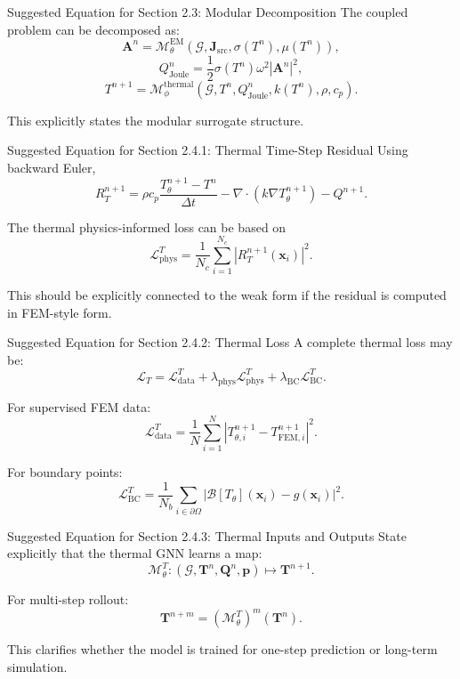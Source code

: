 \documentclass[aspectratio=169]{beamer}
\begin{document}
\begin{frame}{Suggested Equation for Section 2.3: Modular Decomposition}
The coupled problem can be decomposed as:
\[
\mathbf{A}^{n}
=
\mathcal{M}_{\theta}^{\mathrm{EM}}
\left(
\mathcal{G},\mathbf{J}_{\mathrm{src}},\sigma(T^n),\mu(T^n)
\right),
\]
\[
Q_{\mathrm{Joule}}^{n}
=
\frac{1}{2}\sigma(T^n)\omega^2|\mathbf{A}^{n}|^2,
\]
\[
T^{n+1}
=
\mathcal{M}_{\phi}^{\mathrm{thermal}}
\left(
\mathcal{G},T^n,Q_{\mathrm{Joule}}^n,k(T^n),\rho,c_p
\right).
\]

This explicitly states the modular surrogate structure.
\end{frame}

\begin{frame}{Suggested Equation for Section 2.4.1: Thermal Time-Step Residual}
Using backward Euler,
\[
R_T^{n+1}
=
\rho c_p
\frac{T_\theta^{n+1}-T^n}{\Delta t}
-
\nabla\cdot(k\nabla T_\theta^{n+1})
-
Q^{n+1}.
\]

The thermal physics-informed loss can be based on
\[
\mathcal{L}_{\mathrm{phys}}^T
=
\frac{1}{N_c}\sum_{i=1}^{N_c}
\left|R_T^{n+1}(\mathbf{x}_i)\right|^2.
\]

This should be explicitly connected to the weak form if the residual is computed in FEM-style form.
\end{frame}

\begin{frame}{Suggested Equation for Section 2.4.2: Thermal Loss}
A complete thermal loss may be:
\[
\mathcal{L}_{T}
=
\mathcal{L}_{\mathrm{data}}^T
+
\lambda_{\mathrm{phys}}\mathcal{L}_{\mathrm{phys}}^T
+
\lambda_{\mathrm{BC}}\mathcal{L}_{\mathrm{BC}}^T.
\]

For supervised FEM data:
\[
\mathcal{L}_{\mathrm{data}}^T
=
\frac{1}{N}\sum_{i=1}^N
\left|
T_{\theta,i}^{n+1}
-
T_{\mathrm{FEM},i}^{n+1}
\right|^2.
\]

For boundary points:
\[
\mathcal{L}_{\mathrm{BC}}^T
=
\frac{1}{N_b}\sum_{i\in\partial\Omega}
\left|
\mathcal{B}[T_\theta](\mathbf{x}_i)-g(\mathbf{x}_i)
\right|^2.
\]
\end{frame}

\begin{frame}{Suggested Equation for Section 2.4.3: Thermal Inputs and Outputs}
State explicitly that the thermal GNN learns a map:
\[
\mathcal{M}_{\theta}^{T}:
\left(
\mathcal{G},
\mathbf{T}^n,
\mathbf{Q}^n,
\mathbf{p}
\right)
\mapsto
\mathbf{T}^{n+1}.
\]

For multi-step rollout:
\[
\mathbf{T}^{n+m}
=
\left(\mathcal{M}_{\theta}^{T}\right)^m
\left(
\mathbf{T}^{n}
\right).
\]

This clarifies whether the model is trained for one-step prediction or long-term simulation.
\end{frame}
\end{document}
